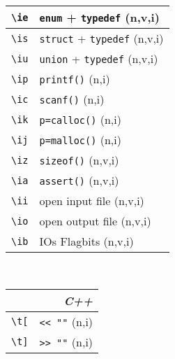 \documentclass[oneside,11pt,landscape,DIV16]{scrartcl}
\begin{document}
\begin{multicols}{3}
\begin{center}
\begin{tabular}[]{|p{11mm}|p{60mm}|}
\hline \verb'\ie'     & \verb'enum'   + \verb'typedef'   \hfill (n,v,i) \\
\hline \verb'\is'     & \verb'struct' + \verb'typedef'   \hfill (n,v,i) \\
\hline \verb'\iu'     & \verb'union'  + \verb'typedef'   \hfill (n,v,i) \\
\hline \verb'\ip'     & \verb'printf()'                  \hfill (n,i)   \\
\hline \verb'\ic'     & \verb'scanf()'                   \hfill (n,i)   \\
\hline \verb'\ik'     & \verb'p=calloc()'                \hfill (n,i)   \\
\hline \verb'\ij'     & \verb'p=malloc()'                \hfill (n,i)   \\
\hline \verb'\iz'     & \verb'sizeof()'                  \hfill (n,v,i) \\
\hline \verb'\ia'     & \verb'assert()'                  \hfill (n,v,i) \\
\hline \verb'\ii'     & open input file                  \hfill (n,v,i) \\
\hline \verb'\io'     & open output file                 \hfill (n,v,i) \\
\hline \verb'\ib'     & IOs Flagbits                     \hfill (n,v,i) \\
\hline
\end{tabular}\\
%
%
%
%
\begin{tabular}[]{|p{12mm}|p{60mm}|}
\hline 
\multicolumn{2}{|r|}{\textsl{C\textbf{++}}} \\
\hline \verb'\t['   & \verb'<< ""'                            \hfill (n,i)               \\
\hline \verb'\t]'   & \verb'>> ""'                            \hfill (n,i)               \\

\end{tabular}
\end{center}
\end{multicols}
\end{document}
